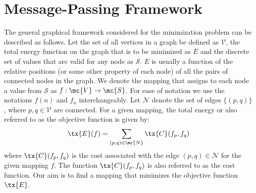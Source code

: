 \documentclass[journal, onecolumn]{IEEEtran}
\begin{document}
\section{Message-Passing Framework}
\label{Section:Message-Passing Framework}
The general graphical framework considered for the minimization problem can be described as follows. Let the set of all vertices in a graph be defined as $\mathcal{V}$, the total energy function on the graph that is to be minimized as $E$ and the discrete set of values that are valid for any node as $\mathcal{S}$. $E$ is usually a function of the relative positions (or some other property of each node) of all the pairs of connected nodes in the graph. We denote the mapping that assigns to each node a value from $\mathcal{S}$ as  $\mathit{f}:\mc{V}\to \mc{S} $. For ease of notation we use the notations $f(n)$ and $f_{n}$ interchangeably. Let $\mathcal{N}$ denote the set of edges $\{(p,q)\}$, where $p,q \in \mathcal{V}$ are connected. For a given mapping, the total energy or also referred to as the objective function is given by:
\begin{equation}
 \tx{E}(f)= \sum\limits_{(p,q)\in \mc{N}} \tx{C}(f_p,f_q)
\label{Eqn:EnergyFunction}
\end{equation}
where $\tx{C}(f_p,f_q)$ is the cost associated with the edge $(p,q)\in \mathcal{N}$ for the given mapping $f$. The function $\tx{C}(f_p,f_q)$  is also referred to as the cost function. Our aim is to find a mapping that minimizes the objective function $\tx{E}$.

\end{document}
